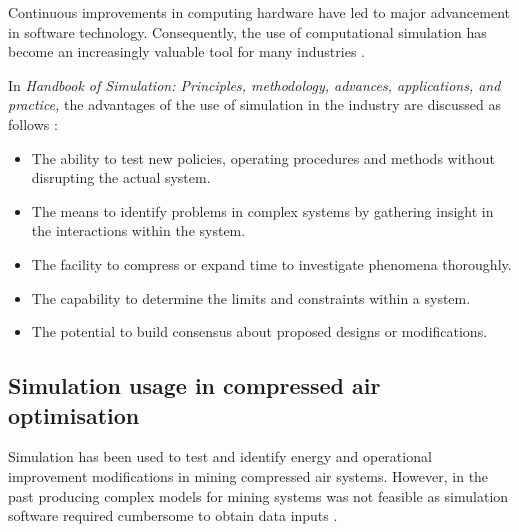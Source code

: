 		Continuous improvements in computing hardware have led to major advancement in software technology. Consequently, the use of computational simulation has become an increasingly valuable tool for many industries \cite{kocsis2003integration}.
		\par 
		In \textit{ Handbook of Simulation: Principles, methodology, advances, applications, and practice,} the advantages of the use of simulation in the industry are discussed as follows \cite{banks1998handbook}: %
		\begin{itemize}
			\item The ability to test new policies, operating procedures and methods without disrupting the actual system.
			\item The means to identify problems in complex systems by gathering insight in the interactions within the system.
			\item The facility to compress or expand time to investigate phenomena thoroughly.
			\item The capability to determine the limits and constraints within a system.
			\item The potential to build consensus about proposed designs or modifications.
		\end{itemize}

	\subsection{Simulation usage in compressed air optimisation}
		Simulation has been used to test and identify energy and operational improvement modifications in mining compressed air systems. However, in the past producing complex models for mining systems was not feasible as simulation software required cumbersome to obtain data inputs \cite{marais2013simplification}. 
		\par 
